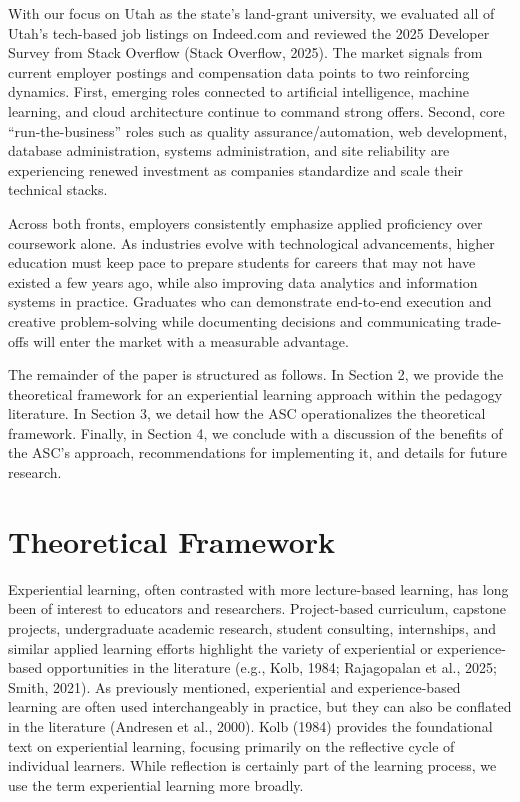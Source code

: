 \documentclass[
  12pt]{article}
\begin{document}
With our focus on Utah as the state's land-grant university, we
evaluated all of Utah's tech-based job listings on Indeed.com and
reviewed the 2025 Developer Survey from Stack Overflow (Stack Overflow,
2025). The market signals from current employer postings and
compensation data points to two reinforcing dynamics. First, emerging
roles connected to artificial intelligence, machine learning, and cloud
architecture continue to command strong offers. Second, core
``run-the-business'' roles such as quality assurance/automation, web
development, database administration, systems administration, and site
reliability are experiencing renewed investment as companies standardize
and scale their technical stacks.

Across both fronts, employers consistently emphasize applied proficiency
over coursework alone. As industries evolve with technological
advancements, higher education must keep pace to prepare students for
careers that may not have existed a few years ago, while also improving
data analytics and information systems in practice. Graduates who can
demonstrate end-to-end execution and creative problem-solving while
documenting decisions and communicating trade-offs will enter the market
with a measurable advantage.

The remainder of the paper is structured as follows. In Section 2, we
provide the theoretical framework for an experiential learning approach
within the pedagogy literature. In Section 3, we detail how the ASC
operationalizes the theoretical framework. Finally, in Section 4, we
conclude with a discussion of the benefits of the ASC's approach,
recommendations for implementing it, and details for future research.

\section{Theoretical Framework}\label{sec-theory}

Experiential learning, often contrasted with more lecture-based
learning, has long been of interest to educators and researchers.
Project-based curriculum, capstone projects, undergraduate academic
research, student consulting, internships, and similar applied learning
efforts highlight the variety of experiential or experience-based
opportunities in the literature (e.g., Kolb, 1984; Rajagopalan et al.,
2025; Smith, 2021). As previously mentioned, experiential and
experience-based learning are often used interchangeably in practice,
but they can also be conflated in the literature (Andresen et al.,
2000). Kolb (1984) provides the foundational text on experiential
learning, focusing primarily on the reflective cycle of individual
learners. While reflection is certainly part of the learning process, we
use the term experiential learning more broadly.
\end{document}
